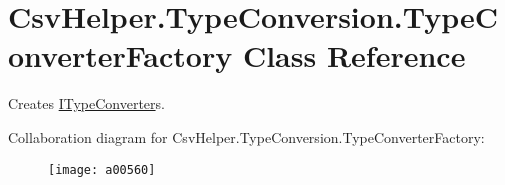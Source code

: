 \hypertarget{a00171}{\section{Csv\-Helper.\-Type\-Conversion.\-Type\-Converter\-Factory Class Reference}
\label{a00171}
}


Creates \hyperlink{a00117}{I\-Type\-Converter}s.  




Collaboration diagram for Csv\-Helper.\-Type\-Conversion.\-Type\-Converter\-Factory\-:
\nopagebreak
\begin{figure}[H]
\begin{center}
\leavevmode
\texttt{[image: a00560]}
\end{center}
\end{figure}
